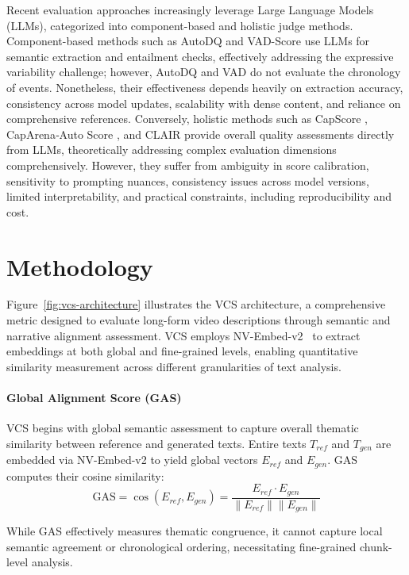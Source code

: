\documentclass[letterpaper]{article} %
\begin{document}
Recent evaluation approaches increasingly leverage Large Language Models (LLMs), categorized into component-based and holistic judge methods. Component-based methods such as AutoDQ \citep{wyzs:24} and VAD-Score \citep{dp:25} use LLMs for semantic extraction and entailment checks, effectively addressing the expressive variability challenge; however, AutoDQ and VAD do not evaluate the chronology of events. Nonetheless, their effectiveness depends heavily on extraction accuracy, consistency across model updates, scalability with dense content, and reliance on comprehensive references. Conversely, holistic methods such as CapScore \citep{li:24}, CapArena‑Auto Score \citep{cheng:25}, and CLAIR \citep{chan:23} provide overall quality assessments directly from LLMs, theoretically addressing complex evaluation dimensions comprehensively. However, they suffer from ambiguity in score calibration, sensitivity to prompting nuances, consistency issues across model versions, limited interpretability, and practical constraints, including reproducibility and cost.

\section{Methodology}
\label{sec:methodology_vcs}

Figure~\ref{fig:vcs-architecture} illustrates the VCS architecture, a comprehensive metric designed to evaluate long-form video descriptions through semantic and narrative alignment assessment. VCS employs NV-Embed-v2~\citep{l:24} to extract embeddings at both global and fine-grained levels, enabling quantitative similarity measurement across different granularities of text analysis.

\paragraph{Global Alignment Score (GAS)}
VCS begins with global semantic assessment to capture overall thematic similarity between reference and generated texts. Entire texts $T_{ref}$ and $T_{gen}$ are embedded via NV-Embed-v2 to yield global vectors $E_{ref}$ and $E_{gen}$. GAS computes their cosine similarity:
\begin{equation} \label{eq:gas_revised}
\text{GAS} = \cos(E_{ref}, E_{gen}) = \frac{E_{ref} \cdot E_{gen}}{\|E_{ref}\| \|E_{gen}\|}
\end{equation}

While GAS effectively measures thematic congruence, it cannot capture local semantic agreement or chronological ordering, necessitating fine-grained chunk-level analysis.
\end{document}
